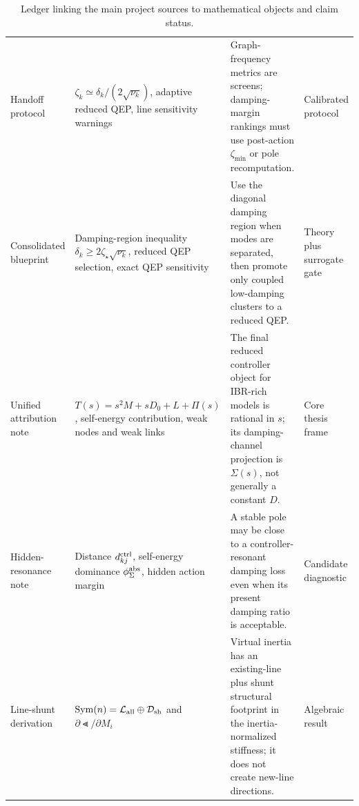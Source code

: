 \begin{table}[p]
\centering
\small
\caption{Ledger linking the main project sources to mathematical objects and
claim status.}
\label{tab:source_claim_ledger_main}
\begin{tabular}{L{0.17\textwidth}L{0.25\textwidth}L{0.30\textwidth}L{0.12\textwidth}}
\toprule
{}
 &  &  & \\
\midrule
Handoff protocol &
\(\zeta_k\simeq\delta_k/(2\sqrt{\nu_k})\), adaptive reduced QEP, line
sensitivity warnings &
Graph-frequency metrics are screens; damping-margin rankings must use
post-action \(\zeta_{\min}\) or pole recomputation. &
Calibrated protocol\\
\addlinespace
Consolidated blueprint &
Damping-region inequality
\(\delta_k\ge 2\zeta_\star\sqrt{\nu_k}\), reduced QEP selection, exact QEP
sensitivity &
Use the diagonal damping region when modes are separated, then promote only
coupled low-damping clusters to a reduced QEP. &
Theory plus surrogate gate\\
\addlinespace
Unified attribution note &
\(T(s)=s^2M+sD_0+L+\Pi(s)\), self-energy contribution, weak nodes and weak
links &
The final reduced controller object for IBR-rich models is rational in \(s\);
its damping-channel projection is \(\Sigma(s)\), not generally a constant
\(D\). &
Core thesis frame\\
\addlinespace
Hidden-resonance note &
Distance \(d^{\rm ctrl}_{kj}\), self-energy dominance \(\phi_\Sigma^{\rm abs}\), hidden
action margin &
A stable pole may be close to a controller-resonant damping loss even when its
present damping ratio is acceptable. &
Candidate diagnostic\\
\addlinespace
Line-shunt derivation &
\(\operatorname{Sym}(n)=\mathcal L_{\rm all}\oplus\mathcal D_{\rm sh}\) and
\(\partial\Lt/\partial M_i\) &
Virtual inertia has an existing-line plus shunt structural footprint in the
inertia-normalized stiffness; it does not create new-line directions. &
Algebraic result\\
\bottomrule
\end{tabular}
\end{table}

